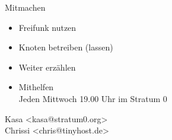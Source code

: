 \documentclass[fleqn,11pt,aspectratio=169]{beamer}
\begin{document}
\begin{frame}{Mitmachen}
\begin{itemize}
	\item Freifunk nutzen 
	\pause
	\item Knoten betreiben (lassen)
	\pause
	\item Weiter erzählen
	\pause
	\item Mithelfen\\
	Jeden Mittwoch 19.00 Uhr im Stratum 0
\end{itemize}
\end{frame}

\begin{finalframe}{}
Kasa <kasa@stratum0.org>\\
Chrissi <chris@tinyhost.de>\\
\end{finalframe}
\end{document}
